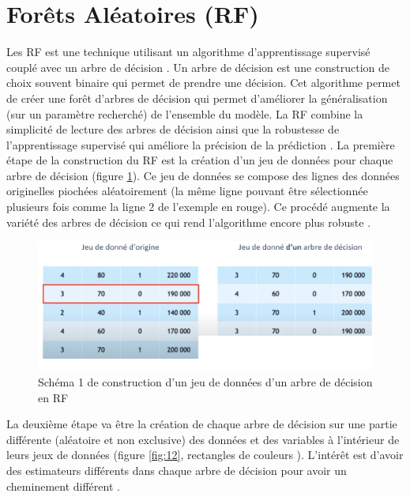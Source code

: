 \documentclass[
  11pt,
  french,
  a4paper,
  extrafontsizes,onecolumn,openright
  ]{memoir}
\begin{document}
\vfill
\newpage

\hypertarget{foruxeats-aluxe9atoires-rf}{%
\section{Forêts Aléatoires (RF)}\label{foruxeats-aluxe9atoires-rf}}

Les RF est une technique utilisant un algorithme d'apprentissage supervisé couplé avec un arbre de décision \autocite{randomForest} \autocite{ggparty}. Un arbre de décision est une construction de choix souvent binaire qui permet de prendre une décision. Cet algorithme permet de créer une forêt d'arbres de décision qui permet d'améliorer la généralisation (sur un paramètre recherché) de l'ensemble du modèle. La RF combine la simplicité de lecture des arbres de décision ainsi que la robustesse de l'apprentissage supervisé qui améliore la précision de la prédiction \autocite{moutarde_arbres_2017}. La première étape de la construction du RF est la création d'un jeu de données pour chaque arbre de décision (figure \ref{fig:11}\autocite{moutarde_arbres_2017}). Ce jeu de données se compose des lignes des données originelles piochées aléatoirement (la même ligne pouvant être sélectionnée plusieurs fois comme la ligne 2 de l'exemple en rouge). Ce procédé augmente la variété des arbres de décision ce qui rend l'algorithme encore plus robuste \autocite{moutarde_arbres_2017}.

\scriptsize

\begin{figure}

{\centering \includegraphics[width=0.8\linewidth]{Images/Figure11} 

}

\caption{Schéma 1 de construction d’un jeu de données d’un arbre de décision en RF}\label{fig:11}
\end{figure}

\normalsize

\vfill
\newpage

La deuxième étape va être la création de chaque arbre de décision sur une partie différente (aléatoire et non exclusive) des données et des variables à l'intérieur de leurs jeux de données (figure \ref{fig:12}, rectangles de couleurs \autocite{moutarde_arbres_2017}). L'intérêt est d'avoir des estimateurs différents dans chaque arbre de décision pour avoir un cheminement différent \autocite{moutarde_arbres_2017}.
\end{document}
